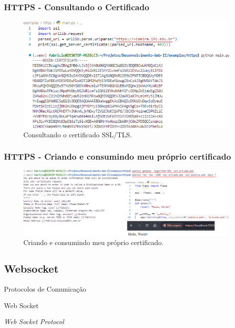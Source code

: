 \documentclass[
	10pt, %
	t, %
]{beamer}
\begin{document}
\begin{frame}
	\frametitle{HTTPS - Consultando o Certificado}

	\begin{figure}
		\centering
		\includegraphics[width=0.9\linewidth]{ssl_consulta.png}
		\caption{Consultando o certificado SSL/TLS.}
		\label{fig:https_ssl}
	\end{figure}

\end{frame}


\begin{frame}
	\frametitle{HTTPS - Criando e consumindo meu próprio certificado}

	\begin{figure}
		\centering
		\includegraphics[width=0.9\linewidth]{ssl_python_example.png}
		\caption{Criando e consumindo meu próprio certificado.}
		\label{fig:https_ssl_example}
	\end{figure}

\end{frame}

\subsection{Websocket}

\begin{frame}
	\begin{center}
		
		\bigskip\bigskip\bigskip\bigskip %
		{\Large Protocolos de Comunicação}
		
		\bigskip\bigskip %
		{\Huge Web Socket}
		
		\smallskip
		{\small \textit{Web Socket Protocol}}
	\end{center}

\end{frame}
\end{document}
